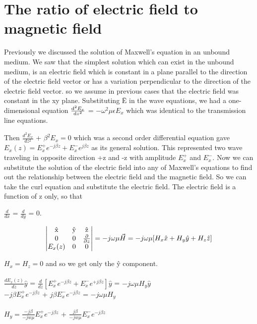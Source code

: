 \chapter{The ratio of electric field to magnetic field}\label{lec:lec22}
Previously we discussed the solution of Maxwell's equation in an unbound medium. We saw that the simplest solution which can exist in the unbound medium, is an electric field which is constant in a plane parallel to the direction of the electric field vector or has a variation perpendicular to the direction of the electric field vector. so we assume in previous cases that the electric field was constant in the xy plane. Substituting \={E} in the wave equations, we had a one-dimensional equation $\dv[2]{E_x}{z}$ = $-\omega^2\mu\epsilon E_x$ which was identical to the transmission line equations. 

Then $\frac{d^2E_x}{dz^2}$ + $\beta^2 E_x = 0$ which was a second order differential equation gave $E_x({z}) = E_x^{+}e^{-j\beta z} + E_x^{-}e^{j\beta z}$ as its general solution. This represented two wave traveling in opposite direction +z and -z with amplitude $E_x^{+}$ and $E_x^{-}$. Now we can substitute the solution of the electric field into any of Maxwell's equations to find out the relationship between the electric field and the magnetic field. So we can take the curl equation and substitute the electric field. The electric field is a function of z only, so that

$\frac{d}{dx}$ = $\frac{d}{dy}$ = 0.


\begin{dmath*}
\begin{vmatrix}
$\^{x}$ & $\^{y}$ & $\^{z}$\\
0 & 0 & \pdv{}{z} \\
$$E_{x}(z)$$ & 0 & 0
\end{vmatrix} =-j\omega\mu\vec{H} =-j\omega\mu[H_x\hat{x} + H_y\hat{y} + H_z\hat{z}]
\end{dmath*}

$H_x = H_z = 0$ and so we get only the \^{y} component.\\
\\
$\frac{dE_x(z)}{dz}\hat{y}$ = $\frac{d}{dz}[E_x^+e^{-j\beta z} + E_x^-e^{+j\beta z}]\hat{y}$ = $-j\omega\mu H_y\hat{y}$\\

$-j\beta E_x^+e^{-j\beta z}$ + $j\beta E_x^-e^{-j\beta z}$ = $-j\omega\mu H_y$\\
\\
$H_y = \frac{-j\beta}{-jw\mu}E_x^{+}e^{-j\beta z}$ + $\frac{j\beta}{-jw\mu}E_x^{-}e^{-j\beta z}$

